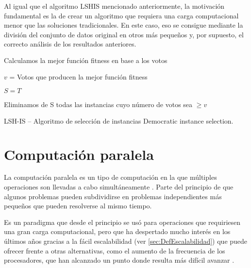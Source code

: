 Al igual que el algoritmo LSHIS mencionado anteriormente, la motivación fundamental es la de crear un algoritmo que requiera una carga computacional menor que las soluciones tradicionales. En este caso, eso se consigue mediante la división del conjunto de datos original en otros más pequeños y, por supuesto, el correcto análisis de los resultados anteriores.


\begin{algorithm*}
\DontPrintSemicolon
{}

Calculamos la mejor función fitness en base a los votos

$v$ = Votos que producen la mejor función fitness

$S = T$

Eliminamos de S todas las instancias cuyo número de votos sea $\geq v$

\caption{LSH-IS -- Algoritmo de selección de instancias Democratic instance selection. \cite{DemoISPaper}}
\label{alg:DemoIS}
\end{algorithm*}




\section{Computación paralela}\label{sec:CompParalela}

La computación paralela es un tipo de computación en la que múltiples operaciones son llevadas a cabo simultáneamente \cite{Almasi:1989}. Parte del principio de que algunos problemas pueden subdividirse en problemas independientes más pequeños que pueden resolverse al mismo tiempo.

Es un paradigma que desde el principio se usó para operaciones que requiriesen una gran carga computacional, pero que ha despertado mucho interés en los últimos años gracias a la fácil escalabilidad (ver \ref{sec:DefEscalabilidad}) que puede ofrecer frente a otras alternativas, como el aumento de la frecuencia de los procesadores, que han alcanzado un punto donde resulta más difícil avanzar \cite{CompParalelaWiki}.

